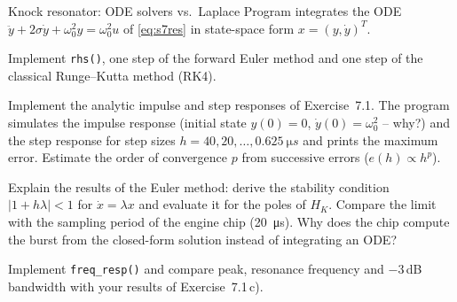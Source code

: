 \begin{exercise}{Knock resonator: ODE solvers vs.\ Laplace}{\JSLinux}
Program  integrates the ODE
$\ddot y+2\sigma\dot y+\omega_0^2y=\omega_0^2u$ of \eqref{eq:s7res} in state-space
form $x=(y,\dot y)^T$.
\begin{tasks}
  \item Implement \texttt{rhs()}, one step of the forward Euler method and one
    step of the classical Runge--Kutta method (RK4).
  \item Implement the analytic impulse and step responses of Exercise~7.1.
    The program simulates the impulse response (initial state
    $y(0)=0$, $\dot y(0)=\omega_0^2$ -- why?) and the step response for step
    sizes $h=40,20,\dots,\SI{0.625}{\micro s}$ and prints the maximum error.
    Estimate the order of convergence $p$ from successive errors
    ($e(h)\propto h^p$).
  \item Explain the results of the Euler method: derive the stability
    condition $|1+h\lambda|<1$ for $\dot x=\lambda x$ and evaluate it for the
    poles of $H_K$. Compare the limit with the sampling period of the engine
    chip (\SI{20}{\micro s}). Why does the chip compute the burst from the
    closed-form solution instead of integrating an ODE?
  \item Implement \texttt{freq\_resp()} and compare peak, resonance frequency
    and $-3$\,dB bandwidth with your results of Exercise~7.1\,c).
\end{tasks}
\end{exercise}

